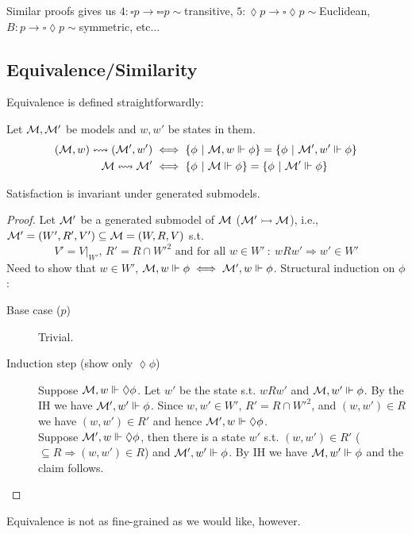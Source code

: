 Similar proofs gives us $4: \square p \to \square\square p \sim$transitive, $5:\lozenge p \to \square \lozenge p\sim$Euclidean, $B: p \to \square \lozenge p \sim$symmetric, etc...

\subsection{Equivalence/Similarity}
Equivalence is defined straightforwardly:
\begin{definition}Let $\mathcal M, \mathcal M'$ be models and $w,w'$ be states in them.
\begin{align*}
(\mathcal M,w) \leftrightsquigarrow (\mathcal M',w') &\iff \{\phi ~|~ \mathcal M, w \Vdash \phi\} = \{\phi ~|~ \mathcal M', w' \Vdash \phi\} \\
\mathcal M \leftrightsquigarrow \mathcal M' &\iff \{\phi ~|~ \mathcal M \Vdash \phi\} = \{\phi ~|~ \mathcal M' \Vdash \phi\}\\
\end{align*}
\end{definition}

\begin{proposition} Satisfaction is invariant under generated submodels. 
\end{proposition}

\begin{proof}Let $\mathcal M'$ be a generated submodel of $\mathcal M$ ($\mathcal M' \rightarrowtail \mathcal M$), i.e., $\mathcal M' = (W', R', V') \subseteq \mathcal M = (W, R, V)$ s.t. 
$$V' = V|_{W'}\text{, }R' = R\cap W'^2 \text{ and for all } w \in W' ~:~ wRw'\Rightarrow  w'\in W'$$
Need to show that $w \in W'$, $\mathcal M, w \Vdash \phi \iff \mathcal M', w \Vdash \phi$. Structural induction on $\phi$: 
\begin{description}
\item[Base case ($p$)] Trivial.
\item[Induction step (show only $\lozenge \phi$)] Suppose $\mathcal M, w \Vdash \lozenge \phi$. Let $w'$ be the state s.t. $wRw'$ and $\mathcal M,w' \Vdash \phi$. By the IH we have $\mathcal M',w'\Vdash \phi$. Since $w,w' \in W'$, $R' = R\cap W'^2$, and $(w,w') \in R$ we have $(w,w') \in R'$ and hence $\mathcal M', w\Vdash \lozenge\phi$.\\
Suppose $\mathcal M', w\Vdash \lozenge\phi$, then there is a state $w'$ s.t. $(w,w') \in R'$ ($\subseteq R \Rightarrow (w,w') \in R$) and $\mathcal M', w' \Vdash \phi$. By IH we have $\mathcal M, w'\Vdash \phi$ and the claim follows.
\end{description}
\end{proof}

Equivalence is not as fine-grained as we would like, however. 

